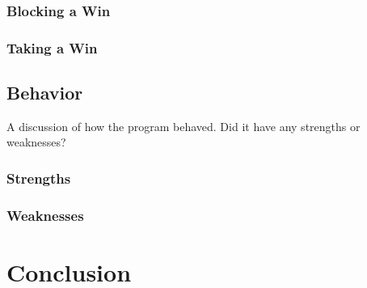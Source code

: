 \documentclass[12pt, article]{scrartcl}
\begin{document}
\subsubsection{Blocking a Win}
\subsubsection{Taking a Win}
\subsection{Behavior}
A discussion of how the program behaved. Did it have any strengths or weaknesses?
\subsubsection{Strengths}
\subsubsection{Weaknesses}
\section{Conclusion}
\end{document}

